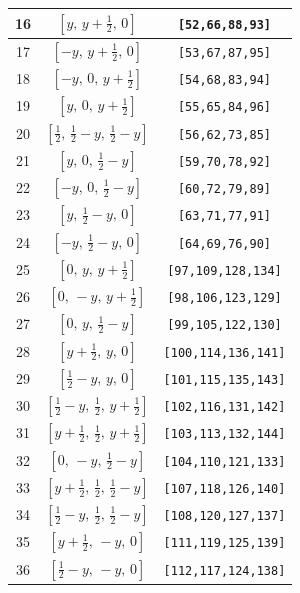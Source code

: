 \documentclass[fleqn,8pt]{jsarticle}
\begin{document}
\begin{longtable}{ccc}
16 & $\left[ y,\, y + \frac{1}{2},\, 0 \right]$ & {\tt [52,66,88,93]} \\ \hline
17 & $\left[ - y,\, y + \frac{1}{2},\, 0 \right]$ & {\tt [53,67,87,95]} \\ \hline
18 & $\left[ - y,\, 0,\, y + \frac{1}{2} \right]$ & {\tt [54,68,83,94]} \\ \hline
19 & $\left[ y,\, 0,\, y + \frac{1}{2} \right]$ & {\tt [55,65,84,96]} \\ \hline
20 & $\left[ \frac{1}{2},\, \frac{1}{2} - y,\, \frac{1}{2} - y \right]$ & {\tt [56,62,73,85]} \\ \hline
21 & $\left[ y,\, 0,\, \frac{1}{2} - y \right]$ & {\tt [59,70,78,92]} \\ \hline
22 & $\left[ - y,\, 0,\, \frac{1}{2} - y \right]$ & {\tt [60,72,79,89]} \\ \hline
23 & $\left[ y,\, \frac{1}{2} - y,\, 0 \right]$ & {\tt [63,71,77,91]} \\ \hline
24 & $\left[ - y,\, \frac{1}{2} - y,\, 0 \right]$ & {\tt [64,69,76,90]} \\ \hline
25 & $\left[ 0,\, y,\, y + \frac{1}{2} \right]$ & {\tt [97,109,128,134]} \\ \hline
26 & $\left[ 0,\, - y,\, y + \frac{1}{2} \right]$ & {\tt [98,106,123,129]} \\ \hline
27 & $\left[ 0,\, y,\, \frac{1}{2} - y \right]$ & {\tt [99,105,122,130]} \\ \hline
28 & $\left[ y + \frac{1}{2},\, y,\, 0 \right]$ & {\tt [100,114,136,141]} \\ \hline
29 & $\left[ \frac{1}{2} - y,\, y,\, 0 \right]$ & {\tt [101,115,135,143]} \\ \hline
30 & $\left[ \frac{1}{2} - y,\, \frac{1}{2},\, y + \frac{1}{2} \right]$ & {\tt [102,116,131,142]} \\ \hline
31 & $\left[ y + \frac{1}{2},\, \frac{1}{2},\, y + \frac{1}{2} \right]$ & {\tt [103,113,132,144]} \\ \hline
32 & $\left[ 0,\, - y,\, \frac{1}{2} - y \right]$ & {\tt [104,110,121,133]} \\ \hline
33 & $\left[ y + \frac{1}{2},\, \frac{1}{2},\, \frac{1}{2} - y \right]$ & {\tt [107,118,126,140]} \\ \hline
34 & $\left[ \frac{1}{2} - y,\, \frac{1}{2},\, \frac{1}{2} - y \right]$ & {\tt [108,120,127,137]} \\ \hline
35 & $\left[ y + \frac{1}{2},\, - y,\, 0 \right]$ & {\tt [111,119,125,139]} \\ \hline
36 & $\left[ \frac{1}{2} - y,\, - y,\, 0 \right]$ & {\tt [112,117,124,138]} \\ \hline

\end{longtable}
\end{document}
